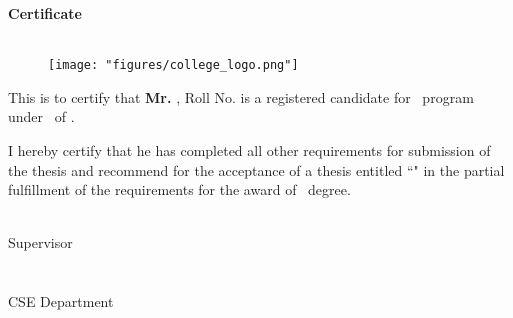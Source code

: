 \begin{center}
    \huge\textbf{Certificate}\\
    \MakeUppercase{\Large{\collegefullname}}\\
    \Large{\department}
\end{center}
\vspace{0.5cm}
\begin{figure}[H]
    \centering
    \texttt{[image: "figures/college\_logo.png"]}
\end{figure}
\vspace{0.5cm}

This is to certify that \textbf{Mr. \cMembThree}, Roll No. \textbf{\cMembThreeRoll} is a registered candidate for \courseShort\ program under \department\ of \collegefullname.

I hereby certify that he has completed all other requirements for submission of the thesis and recommend for the acceptance of a thesis entitled ``\textbf{\projectname}" in the partial fulfillment of the requirements for the award of \courseShort\ degree. 


\vspace{2cm}

\begin{minipage}[t]{0.45\textwidth}
    \begin{flushleft}
        {\underline{\hspace{5cm}}}\\
        Supervisor\\
        \guidename\\
        \guideDesignation \\
        CSE Department\\
        \collegefullname\\
        
    \end{flushleft}
\end{minipage}

